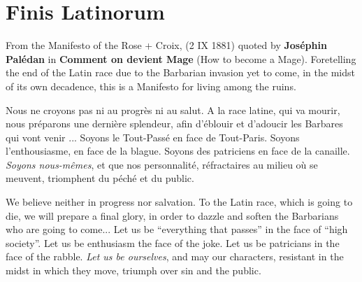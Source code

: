 \section{Finis Latinorum}

From the Manifesto of the Rose + Croix, (2 IX 1881) quoted by \textbf{Joséphin Palédan} in \textbf{Comment on devient Mage} (How to become a Mage). Foretelling the end of the Latin race due to the Barbarian invasion yet to come, in the midst of its own decadence, this is a Manifesto for living among the ruins.

\begin{quotex}
Nous ne croyons pas ni au progrès ni au salut. A la race latine, qui va mourir, nous préparons une dernière splendeur, afin d'éblouir et d'adoucir les Barbares qui vont venir ... Soyons le Tout-Passé en face de Tout-Paris. Soyons l'enthousiasme, en face de la blague. Soyons des patriciens en face de la canaille. \emph{Soyons nous-mêmes}, et que nos personnalité, réfractaires au milieu où se meuvent, triomphent du péché et du public.
\end{quotex}


\begin{quotex}
We believe neither in progress nor salvation. To the Latin race, which is going to die, we will prepare a final glory, in order to dazzle and soften the Barbarians who are going to come... Let us be ``everything that passes'' in the face of ``high society''. Let us be enthusiasm the face of the joke. Let us be patricians in the face of the rabble. \emph{Let us be ourselves}, and may our characters, resistant in the midst in which they move, triumph over sin and the public.
\end{quotex}





